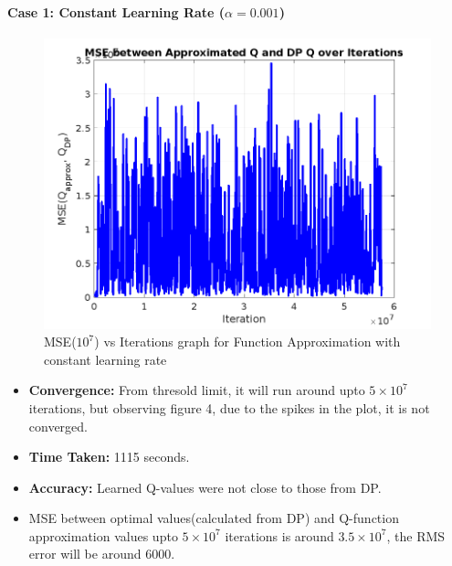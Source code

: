 \documentclass[10pt,twocolumn,letterpaper]{article}
\begin{document}
\paragraph{Case 1: Constant Learning Rate ($\alpha = 0.001$)}
\begin{figure}
    \centering
    \includegraphics[width=1\linewidth]{Q_MSE_vs_Iteration.png}
    \caption{MSE($10^7$) vs Iterations graph for Function Approximation with constant learning rate}
    \label{fig:enter-label}
\end{figure}
\begin{itemize}
    \item \textbf{Convergence:} From thresold limit, it will run around upto $5\times10^7$ iterations, but observing figure 4, due to the spikes in the plot, it is not converged.
    \item \textbf{Time Taken:} 1115 seconds.
    \item \textbf{Accuracy:} Learned Q-values were not close to those from DP.
    \item MSE between optimal values(calculated from DP) and Q-function approximation values upto $5\times10^7$ iterations is around $3.5 \times 10^7$, the RMS error will be around 6000.
\end{itemize}
\end{document}
